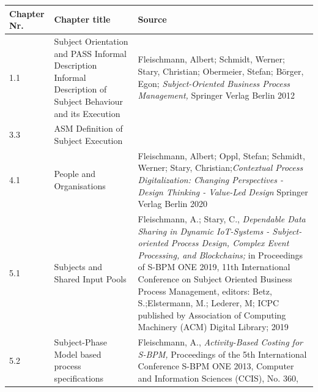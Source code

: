 	\begin{longtable}[t]{ p{1 cm} p{4 cm} p{7 cm} }	
	\toprule
		\textbf{Chapter Nr.} & \textbf{Chapter title}  & \textbf{Source}
		\\
		\midrule
		1.1 \newline 2.1 \newline 3.1 & Subject Orientation and PASS \newline Informal Description \newline Informal Description of Subject Behaviour and its Execution & Fleischmann, Albert; Schmidt, Werner; Stary, Christian; Obermeier, Stefan; B\"orger, Egon; \newline \textit{Subject-Oriented Business Process Management,} \newline Springer Verlag Berlin 2012
		\\
		\midrule
		3.3 & ASM Definition of Subject Execution & 
		\\
		\midrule
		4.1 & People and Organisations & Fleischmann, Albert; Oppl, Stefan; Schmidt, Werner; Stary, Christian;\newline \textit{Contextual Process Digitalization: Changing Perspectives - Design Thinking - Value-Led Design} \newline Springer Verlag Berlin 2020
		\\
		\midrule
		5.1 & Subjects and Shared Input Pools & Fleischmann, A.; Stary, C.,\newline
			\textit{Dependable Data Sharing in Dynamic IoT-Systems - Subject-oriented Process Design, Complex Event Processing, and Blockchains;} \newline
			in Proceedings of S-BPM ONE 2019, 11th International Conference on Subject Oriented Business Process Management,\newline
			editors: Betz, S.;Elstermann, M.; Lederer, M; \newline
			ICPC published by Association of Computing Machinery (ACM) Digital Library; 2019
		\\
		\midrule
		5.2 & Subject-Phase Model based process specifications &  Fleischmann, A.,\newline
		\textit{Activity-Based Costing for S-BPM,}\newline
		Proceedings of the 5th International Conference S-BPM ONE 2013, Computer and Information Sciences (CCIS), No. 360,\newline

\end{longtable}
